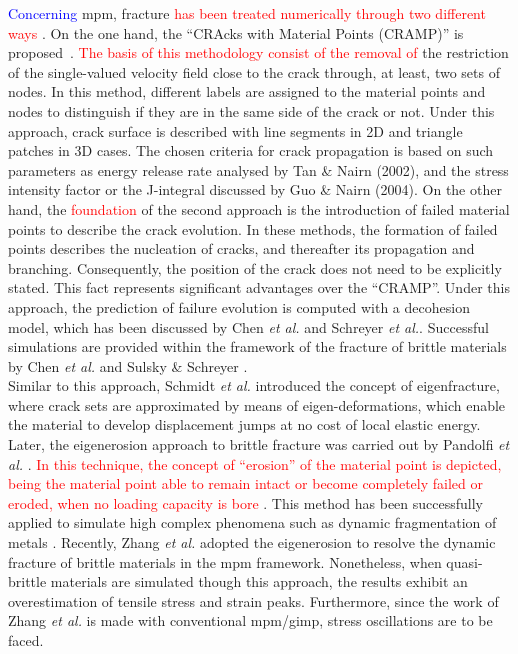 \documentclass[preprint,12pt,a4paper]{elsarticle}
\newcommand{\PNA}[1]{
  \textcolor{red}{{#1}}
}
\newcommand{\MMP}[1]{
  \textcolor{blue}{{#1}}
}
\begin{document}
\MMP{Concerning} \acrshort{mpm}, fracture \PNA{has been treated numerically through two different ways}. On the one hand, the ``CRAcks with Material Points (CRAMP)'' is proposed~\cite{Nairn_2003,Nairn_2006}. \PNA{The basis of this methodology consist of the removal of} the restriction
of the single-valued velocity field close to the crack through, at least, two sets of nodes. In this method, different labels are assigned to the material points
and nodes to distinguish if they are in the same side of the crack or
not. Under this approach, crack surface is described with line segments
in 2D and triangle patches in 3D cases. The chosen criteria for crack
propagation is based on such parameters as energy release rate
analysed by Tan \& Nairn (2002)\cite{Nairn_2002}, and the stress
intensity factor or the J-integral discussed by Guo \& Nairn
(2004)\cite{Nairn_2004}. 
On the other hand, the \PNA{foundation} of the second approach is the introduction of failed
material points to describe the crack evolution. In these methods, the
formation of failed points describes the nucleation of cracks, and
thereafter its propagation and branching. Consequently, the position
of the crack does not need to be explicitly stated. This fact represents
significant advantages over the ``CRAMP''. Under this approach, the
prediction of failure evolution is computed with a decohesion model,
which has been discussed by Chen {\it et al.}\cite{Zhenmao_2005} and
Schreyer {\it et al.}\cite{Schreyer_2002}. Successful simulations are provided within the framework of the fracture of brittle materials by Chen {\it et
  al.} \cite{Chen_2002,Chen_2003} and Sulsky \& Schreyer
\cite{Sulsky_2004}.\\

Similar to this approach, Schmidt {\it et al.}
\cite{Schmidt_2009} introduced the concept of eigenfracture, where
crack sets are approximated by means of eigen-deformations, which
enable the material to develop displacement jumps at no cost of local
elastic energy. Later, the eigenerosion approach to brittle fracture
was carried out by Pandolfi {\it et al.}
\cite{Pandolfi_2012,Pandolfi_2013}. \PNA{In this technique, the concept of ``erosion'' of
the material point is depicted, being the material point able to remain intact or become completely failed or eroded, when no loading
capacity is bore}. This method has been successfully applied to simulate high
complex phenomena such as dynamic fragmentation of metals
\cite{Li_2015}. Recently, Zhang {\it et al.}
\cite{Zhang_EE_2020} adopted the eigenerosion to resolve the dynamic
fracture of brittle materials in the \acrshort{mpm}
framework. Nonetheless, when quasi-brittle materials are simulated
though this approach, the results exhibit an overestimation of tensile
stress and strain peaks. Furthermore, since the work of Zhang {\it et al.}
\cite{Zhang_EE_2020} is made with conventional \acrshort{mpm}/\acrshort{gimp}, stress oscillations are to be faced.\\
\end{document}
